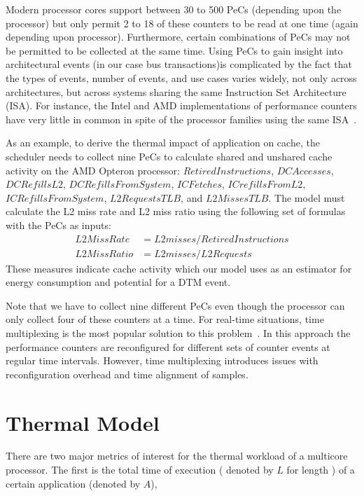 \documentclass[]{sig-alternate-hotpower09}
\begin{document}
Modern processor cores support between 30 to 500 PeCs (depending upon
the processor) but only permit 2 to 18 of these counters to be read at
one time (again depending upon processor).  Furthermore, certain
combinations of PeCs may not be permitted to be collected at the same
time. Using PeCs to gain insight into architectural events (in our case
bus transactions)is complicated by the fact that the types of events,
number of events, and use cases varies widely, not only across
architectures, but across systems sharing the same Instruction Set
Architecture (ISA).  For instance, the Intel and AMD implementations of
performance counters have very little in common in spite of the
processor families using the same ISA~\cite{Singhal2008}\cite{AMD2008}.

As an example, to derive the thermal impact of application on cache, the
scheduler needs to collect nine PeCs to calculate shared and unshared
cache activity on the AMD Opteron processor: $RetiredInstructions$,
$DCAccesses$, $DCRefillsL2$, $DCRefillsFromSystem$, $ICFetches$,
$ICrefillsFromL2$, $ICRefillsFromSystem$, $L2RequestsTLB$, and
$L2MissesTLB$.  The model must calculate the L2 miss rate and L2 miss
ratio using the following set of formulas with the PeCs as inputs:
\begin{align}
  L2MissRate &= L2misses / RetiredInstructions\nonumber\\
  L2MissRatio & = L2misses / L2Requests\nonumber
\end{align}
These measures indicate cache activity which our model uses as an estimator
for energy consumption and potential for a DTM event.

Note that we have to collect nine different PeCs even though the
processor can only collect four of these counters at a time.  For
real-time situations, time multiplexing is the most popular solution to
this problem~\cite{Azimi2005}. In this approach the performance
counters are reconfigured for different sets of counter events at
regular time intervals.  However, time multiplexing introduces issues
with reconfiguration overhead and time alignment of samples.
\section{Thermal Model}
\label{sec:thermal}
There are two major metrics of interest for the thermal workload of a
multicore processor. The first is the total time of execution ( denoted
by $L$ for length ) of a certain application (denoted by $A$),
\end{document}
